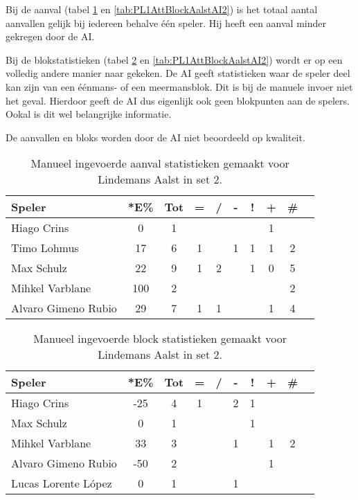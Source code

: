 Bij de aanval (tabel \ref{tab:PL1AttAalstMan2} en \ref{tab:PL1AttBlockAalstAI2}) is het totaal aantal aanvallen gelijk bij iedereen behalve één speler. Hij heeft een aanval minder gekregen door de AI. 

Bij de blokstatistieken (tabel \ref{tab:PL1BlockAalstMan2} en \ref{tab:PL1AttBlockAalstAI2}) wordt er op een volledig andere manier naar gekeken. De AI geeft statistieken waar de speler deel kan zijn van een éénmans- of een meermansblok. Dit is bij de manuele invoer niet het geval. Hierdoor geeft de AI dus eigenlijk ook geen blokpunten aan de spelers. Ookal is dit wel belangrijke informatie.

De aanvallen en bloks worden door de AI niet beoordeeld op kwaliteit.

\begin{table}[ht!]
  \centering
  \scriptsize
    \begin{tabular}{|l|c|c|c|c|c|c|c|c|c|}
      \hline
      \textbf{Speler} & *E\% & Tot & = & / & - & ! & + & \# \\ \hline
      Hiago Crins  & 0 & 1 &  &  &  &  & 1 &  \\ 
      Timo Lohmus  & 17 & 6 & 1 &  & 1 & 1 & 1 & 2 \\ 
      Max Schulz  & 22 & 9 & 1 & 2 &  & 1 & 0 & 5\\
      Mihkel Varblane  & 100 & 2 &  &  &  &  &  & 2 \\ 
      Alvaro Gimeno Rubio & 29 & 7 & 1 & 1 &  &  & 1 & 4 \\ \hline 
  \end{tabular}
\caption[Manueel ingevoerde aanval statistieken gemaakt Lindemans Aalst in set 2]{\label{tab:PL1AttAalstMan2}Manueel ingevoerde aanval statistieken gemaakt voor Lindemans Aalst in set 2.}
\end{table}

\begin{table}[ht!]
  \centering
  \scriptsize
    \begin{tabular}{|l|c|c|c|c|c|c|c|c|c|}
      \hline
      \textbf{Speler} & *E\% & Tot & = & / & - & ! & + & \# \\ \hline
      Hiago Crins & -25 & 4 & 1 &  & 2 & 1 &  &  \\ 
      Max Schulz & 0 & 1 &  &  &  & 1 &  & \\
      Mihkel Varblane & 33 & 3 &  &  & 1 &  & 1 & 2 \\
      Alvaro Gimeno Rubio & -50 & 2 &  & &  &  & 1 &  \\
      Lucas Lorente López & 0 & 1 &  &  & 1 &  &  &  \\ \hline
  \end{tabular}
\caption[Manueel ingevoerde blokstatistieken gemaakt Lindemans Aalst in set 2]{\label{tab:PL1BlockAalstMan2}Manueel ingevoerde block statistieken gemaakt voor Lindemans Aalst in set 2.}
\end{table}

